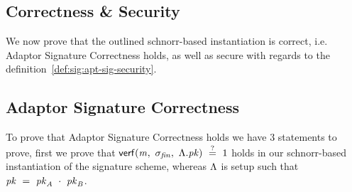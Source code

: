 \subsection{Correctness \& Security}\label{sec:sig:two-party-apt-security}

We now prove that the outlined schnorr-based instantiation is correct, i.e. Adaptor Signature Correctness holds, as well as secure with regards to the definition~\ref{def:sig:apt-sig-security}.

\subsection{Adaptor Signature Correctness}\label{subsec:sig:aptsig-correctness}

To prove that Adaptor Signature Correctness holds we have 3 statements to prove, first we prove that $\mathsf{verf}(\mathit{m} ,~ \sigma_{\mathit{fin}} ,~ \Lambda.\mathit{pk}) ~\stackrel{?}{=}~ 1$ holds in our
schnorr-based instantiation of the signature scheme, whereas $\Lambda$ is setup such that $\mathit{pk} ~=~ \mathit{pk}_{\mathit{A}} ~\cdot~ \mathit{pk}_{\mathit{B}}$.

